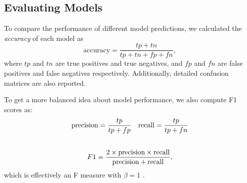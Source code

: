\subsection{Evaluating Models} \label{evalmodels}
To compare the performance of different model predictions, we calculated the \textit{accuracy} of each model as
\begin{equation}
    \text{accuracy} = \frac{tp+tn}{tp+tn+fp+fn},
\end{equation}
where $tp$ and $tn$ are true positives and true negatives, and $fp$ and $fn$ are false positives and false negatives respectively. Additionally, detailed confusion matrices are also reported. %

To get a more balanced idea about model performance, we also compute F1 scores as:
\begin{gather}
    \text{precision} = \frac{tp}{tp+fp} \quad
 \text{recall} = \frac{tp}{tp+fn}\\
 \vspace{0.1cm} \notag \\
F1 = \frac{2\times\text{precision} \times \text{recall}}{\text{precision} + \text{recall}},
\end{gather}
which is effectively an F measure with $\beta=1$ \cite{sokolova2006beyond}.

